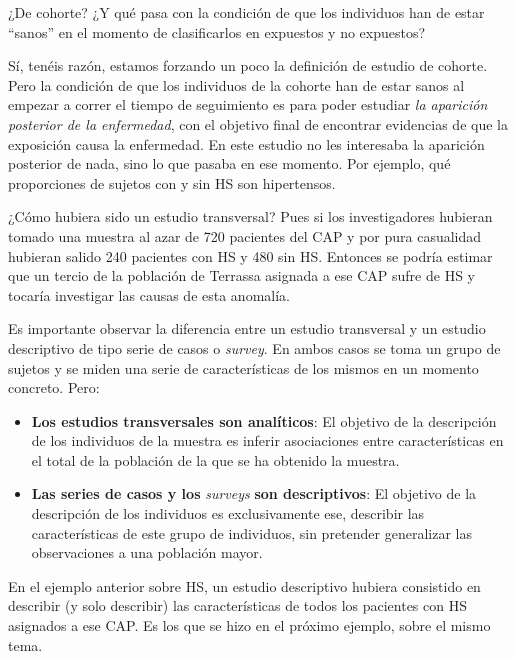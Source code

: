 \documentclass[
]{book}
\theoremstyle{definition}
\theoremstyle{definition}
\theoremstyle{definition}
\theoremstyle{definition}
\theoremstyle{remark}
\begin{document}
\begin{rmdromans}
¿De cohorte? ¿Y qué pasa con la condición de que los individuos han de estar ``sanos'' en el momento de clasificarlos en expuestos y no expuestos?

Sí, tenéis razón, estamos forzando un poco la definición de estudio de cohorte. Pero la condición de que los individuos de la cohorte han de estar sanos al empezar a correr el tiempo de seguimiento es para poder estudiar \emph{la aparición posterior de la enfermedad}, con el objetivo final de encontrar evidencias de que la exposición causa la enfermedad. En este estudio no les interesaba la aparición posterior de nada, sino lo que pasaba en ese momento. Por ejemplo, qué proporciones de sujetos con y sin HS son hipertensos.
\end{rmdromans}

¿Cómo hubiera sido un estudio transversal? Pues si los investigadores hubieran tomado una muestra al azar de 720 pacientes del CAP y por pura casualidad hubieran salido 240 pacientes con HS y 480 sin HS. Entonces se podría estimar que un tercio de la población de Terrassa asignada a ese CAP sufre de HS y tocaría investigar las causas de esta anomalía.

\begin{rmdcaution}
Es importante observar la diferencia entre un estudio transversal y un estudio descriptivo de tipo serie de casos o \emph{survey}. En ambos casos se toma un grupo de sujetos y se miden una serie de características de los mismos en un momento concreto. Pero:

\begin{itemize}
\item
  \textbf{Los estudios transversales son analíticos}: El objetivo de la descripción de los individuos de la muestra es inferir asociaciones entre características en el total de la población de la que se ha obtenido la muestra.
\item
  \textbf{Las series de casos y los} \emph{surveys} \textbf{son descriptivos}: El objetivo de la descripción de los individuos es exclusivamente ese, describir las características de este grupo de individuos, sin pretender generalizar las observaciones a una población mayor.
\end{itemize}
\end{rmdcaution}

En el ejemplo anterior sobre HS, un estudio descriptivo hubiera consistido en describir (y solo describir) las características de todos los pacientes con HS asignados a ese CAP. Es los que se hizo en el próximo ejemplo, sobre el mismo tema.
\end{document}
